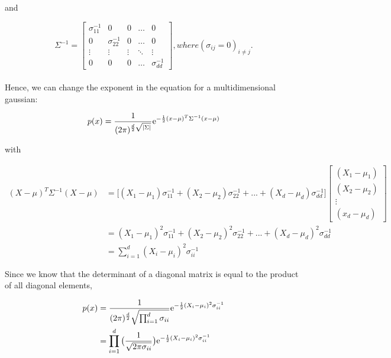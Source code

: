 \documentclass{amsart}
\theoremstyle{definition}
\theoremstyle{remark}
\numberwithin{equation}{section}
\begin{document}
and

\begin{equation}
    \Sigma^{-1} = \begin{bmatrix}
        \sigma_{11}^{-1} &           0 &      0 & \dots  & 0 \\
                  0 & \sigma_{22}^{-1} &      0 & \dots  & 0 \\
             \vdots &      \vdots & \vdots & \ddots & \vdots \\
                  0 &           0 &      0 & \dots  & \sigma_{dd}^{-1}
    \end{bmatrix}, where (\sigma_{ij}=0)_{i \neq j}.
\end{equation}\\

Hence, we can change the exponent in the equation for a multidimensional gaussian:

\begin{equation}
    p(x) = \frac{1}{(2\pi)^{\frac{d}{2} \sqrt{|\Sigma|}}} {\rm e}^{-\frac{1}{2}(x-\mu)^T \Sigma^{-1} (x-\mu)}   
\end{equation}

with 

\begin{equation}
    \begin{align}
    (X-\mu)^T \Sigma^{-1} (X-\mu) & = \big[(X_1-\mu_1)\sigma_{11}^{-1} + (X_2-\mu_2)\sigma_{22}^{-1} + ... + (X_d-\mu_d)\sigma_{dd}^{-1}\big] \begin{bmatrix}
           (X_1-\mu_1) \\
           (X_2-\mu_2) \\
           \vdots \\
           (x_d-\mu_d)
        \end{bmatrix} \\
    & = (X_1-\mu_1)^2 \sigma_{11}^{-1} + (X_2-\mu_2)^2 \sigma_{22}^{-1} + ... + (X_d-\mu_d)^2 \sigma_{dd}^{-1} \\
    & = \sum_{i=1}^{d}(X_i-\mu_i)^2 \sigma_{ii}^{-1}
    \end{align}
\end{equation}

Since we know that the determinant of a diagonal matrix is equal to the product 
of all diagonal elements, 

\begin{equation}
    \begin{align}
    p(x) & = \frac{1}{(2\pi)^{\frac{d}{2}} \sqrt{\prod_{i=1}^{d}\sigma_{ii}}} {\rm e}^{-\frac{1}{2}(X_i-\mu_i)^2 \sigma_{ii}^{-1}} \\
         & = \prod_{i=1}^{d} \big(\frac{1}{\sqrt{2\pi \sigma_{ii}}} \big) {\rm e}^{-\frac{1}{2}(X_i-\mu_i)^2 \sigma_{ii}^{-1}}
    \end{align}
\end{equation}
\end{document}

